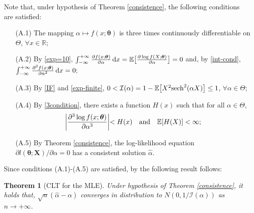 \documentclass[12pt]{article}
\newtheorem{theorem}{Theorem}[section]
\theoremstyle{definition}
\begin{document}
Note that, under hypothesis of Theorem \ref{consistence}, the following conditions are satisfied:

\begin{enumerate}
\item[(A.1)] The mapping $\alpha \longmapsto f(x; \boldsymbol{\theta})$ is three times continuously differentiable on $\Theta$, $\forall x\in\mathbb{R}$;
\item[(A.2)] By \eqref{exp=10}, $\int_{-\infty}^{+\infty} {\partial f(x;\boldsymbol{\theta})\over \partial \alpha}\, {\rm d}x=\mathbb{E}\big[{\partial \log f(X;\boldsymbol{\theta})\over \partial \alpha }\big]=0$ and, by \eqref{int-cond},
$
\int_{-\infty}^{+\infty} {\partial^2 f(x;\boldsymbol{\theta})\over \partial \alpha^2}\, {\rm d}x=0;
$
\item[(A.3)]  By \eqref{IF} and \eqref{exp-finite},
$
0<
\mathcal{I}(\alpha)
=
1- \mathbb{E}\big[X^2{\rm sech}^2(\alpha X)\big]
\leq 1
$,
$\forall \alpha\in\Theta$;
\item[(A.4)] 
By \eqref{3condition},
there exists a function $H(x)$ such that for all $\alpha\in\Theta$,
\begin{align*}
\biggl\vert {\partial^3 \log f(x;\boldsymbol{\theta})\over \partial \alpha^3 }\biggl\vert <H(x) 
\quad \text{and}\quad 
\mathbb{E}[H(X)]<\infty;
\end{align*}
\item[(A.5)] By Theorem \ref{consistence}, the log-likelihood equation ${\partial l(\boldsymbol{\theta};\boldsymbol{X})/ \partial \alpha }= 0$ has a consistent solution $\widehat{\alpha}$.
\end{enumerate}
Since conditions (A.1)-(A.5) are satisfied, by \cite{cra:46} the following result follows:

\begin{theorem}[CLT for the MLE]
Under hypothesis of Theorem \ref{consistence},
it holds that, $\sqrt{n}(\widehat{\alpha}- \alpha)$ converges in distribution to $N(0, 1/\mathcal{I}(\alpha))$ as $n\to +\infty$.
\end{theorem}

% 
\end{document}
